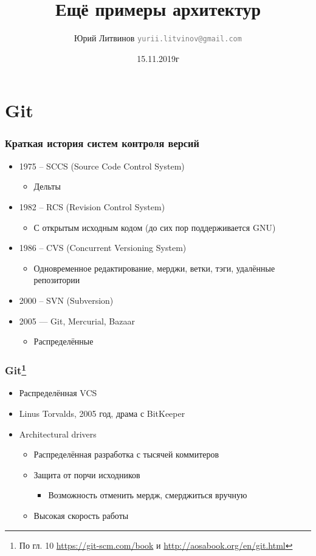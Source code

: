 \documentclass[xetex,mathserif,serif]{beamer}
\title{Ещё примеры архитектур}
\author[Юрий Литвинов]{Юрий Литвинов \newline \textcolor{gray}{\small\texttt{yurii.litvinov@gmail.com}}}
\date{15.11.2019г}
\begin{document}
	
	\frame{\titlepage}

	\section{Git}

	\begin{frame}
		\frametitle{Краткая история систем контроля версий}
		\begin{itemize}
			\item 1975 -- SCCS (Source Code Control System)
			\begin{itemize}
				\item Дельты
			\end{itemize}
			\item 1982 -- RCS (Revision Control System)
			\begin{itemize}
				\item С открытым исходным кодом (до сих пор поддерживается GNU)
			\end{itemize}
			\item 1986 -- CVS (Concurrent Versioning System)
			\begin{itemize}
				\item Одновременное редактирование, мерджи, ветки, тэги, удалённые репозитории
			\end{itemize}
			\item 2000 -- SVN (Subversion)
			\item 2005 --- Git, Mercurial, Bazaar
			\begin{itemize}
				\item Распределённые
			\end{itemize}
		\end{itemize}
	\end{frame}

	\begin{frame}
		\frametitle{Git\footnote{\tiny{По гл. 10 \url{https://git-scm.com/book} и \url{http://aosabook.org/en/git.html}}}}
		\begin{itemize}
			\item Распределённая VCS
			\item Linus Torvalds, 2005 год, драма с BitKeeper
			\item Architectural drivers
			\begin{itemize}
				\item Распределённая разработка с тысячей коммитеров
				\item Защита от порчи исходников
				\begin{itemize}
					\item Возможность отменить мердж, смерджиться вручную
				\end{itemize}
				\item Высокая скорость работы
			\end{itemize}
		\end{itemize}
	\end{frame}
\end{document}
